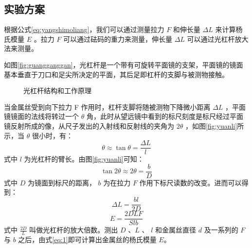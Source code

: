 \documentclass[a4paper]{extarticle}
\begin{document}
    \subsection{实验方案}
    \hspace{2em}
    根据公式\ref{eq:yangshimoliang}，我们可以通过测量拉力 $F$ 和伸长量 $\Delta L$ 来计算杨氏模量 $E$ 。拉力 $F$ 可以通过砝码的重力来测量，伸长量 $\Delta L$ 可以通过光杠杆放大法来测量。
    \par\hspace{2em}
    如图\ref{fig:guangganggan}，光杠杆是一个带有可旋转平面镜的支架，平面镜的镜面基本垂直于刀口和足尖所决定的平面，其后足即杠杆的支脚与被测物接触。
    \begin{figure}[H]
        \centering
        \caption{光杠杆结构和工作原理}
    \end{figure}
    \par\hspace{2em}当金属丝受到向下拉力 F 作用时，杠杆支脚将随被测物下降微小距离 $\Delta L$ ，平面镜镜面的法线将转过一个 $\theta$ 角，此时从望远镜中看到的标尺刻度是标尺经过平面镜反射所成的像，从尺子发出的入射线和反射线的夹角为 $2\theta$ ，如图\ref{fig:yuanli}所示，当 $\theta$ 很小时，有：
    \begin{equation*}
        \theta\approx\tan\theta=\frac{\Delta L}{l}
    \end{equation*}
    式中 $l$ 为光杠杆的臂长。由图\ref{fig:yuanli}可知：
    \begin{equation*}
        \tan2\theta\approx2\theta=\frac{b}{D}
    \end{equation*}
    式中 $D$ 为镜面到标尺的距离， $b$ 为在拉力 $F$ 作用下标尺读数的改变。进而可以得到：
    \begin{equation*}
        \Delta L=\frac{bl}{2D}
    \end{equation*}
    \begin{equation}
        E=\frac{2DLF}{Slb}
        \label{eq:1}
    \end{equation}
    式中 $\frac{2D}{L}$ 叫做光杠杆的放大倍数。测出 $D$ 、$L$ 、 $l$ 和金属丝直径 $d$ 及一系列的 $F$ 与 $b$ 之后，由式\ref{eq:1}即可计算出金属丝的杨氏模量 $E$。
\end{document}
